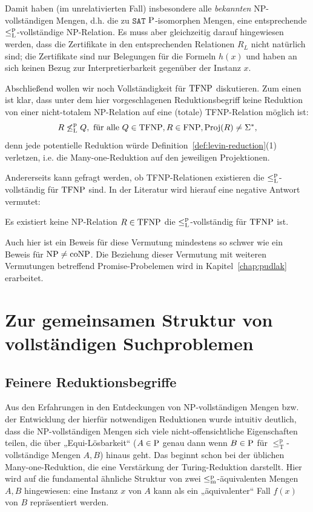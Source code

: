 Damit haben (im unrelativierten Fall) insbesondere alle \emph{bekannten} NP-vollständigen Mengen, d.h. die zu $\mathtt{SAT}$ $\P$-isomorphen Mengen, eine entsprechende $\leqlp$-vollständige NP-Relation.
Es muss aber gleichzeitig darauf hingewiesen werden, dass die Zertifikate in den entsprechenden Relationen $R_L$ nicht natürlich sind; die Zertifikate sind nur Belegungen für die Formeln $h(x)$ und haben an sich keinen Bezug zur Interpretierbarkeit gegenüber der Instanz $x$.

Abschließend wollen wir noch Vollständigkeit für $\TFNP$ diskutieren. Zum einen ist klar, dass unter dem hier vorgeschlagenen Reduktionsbegriff keine Reduktion von einer nicht-totalem NP-Relation auf eine (totale) TFNP-Relation möglich ist: 
\[ R \not\leqlp Q, \text{ für alle } Q\in\TFNP, R\in\FNP, \Proj(R)\neq\Sigma^*, \]
denn jede potentielle Reduktion würde Definition~\ref{def:levin-reduction}(1) verletzen, i.e. die Many-one-Reduktion auf den jeweiligen Projektionen.

Andererseits kann gefragt werden, ob TFNP-Relationen existieren die $\leqlp$-vollständig für $\TFNP$ sind. In der Literatur \parencite[vgl.][]{pudlak_incompleteness_2017} wird hierauf eine negative Antwort vermutet:
\begin{conjecture}[\hTFNP]
    Es existiert keine NP-Relation $R\in\TFNP$ die $\leqlp$-vollständig für $\TFNP$ ist.
\end{conjecture}
Auch hier ist ein Beweis für diese Vermutung mindestens so schwer wie ein Beweis für $\NP\neq\coNP$. Die Beziehung dieser Vermutung mit weiteren Vermutungen betreffend Promise-Probelemen wird in Kapitel~\ref{chap:pudlak} erarbeitet.

\section{Zur gemeinsamen Struktur von vollständigen Suchproblemen}\label{sec:gemeinsame-struktur}

\subsection*{Feinere Reduktionsbegriffe}

Aus den Erfahrungen in den Entdeckungen von NP-vollständigen Mengen bzw. der Entwicklung der hierfür notwendigen Reduktionen wurde intuitiv deutlich, dass die NP-vollständigen Mengen sich viele nicht-offensichtliche Eigenschaften teilen, die über „Equi-Lösbarkeit“ ($A\in \P$ genau dann wenn $B\in \P$ für $\leq_\mathrm T^\mathrm p$-vollständige Mengen $A,B$) hinaus geht.
%
Das beginnt schon bei der üblichen Many-one-Reduktion, die eine Verstärkung der Turing-Reduktion darstellt. Hier wird auf die fundamental ähnliche Struktur von zwei $\leqmp$-äquivalenten Mengen $A, B$ hingewiesen: eine Instanz $x$ von $A$ kann als ein „äquivalenter“ Fall $f(x)$ von $B$ repräsentiert werden.

